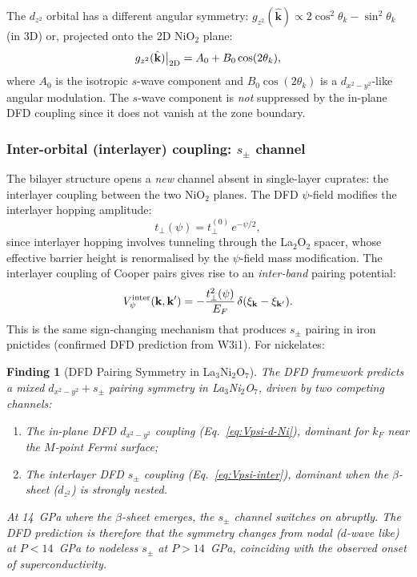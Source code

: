 \documentclass[11pt]{article}
\newtheorem{finding}{Finding}
\begin{document}
The $d_{z^2}$ orbital has a different angular symmetry:
$g_{z^2}(\hat{\mathbf{k}}) \propto 2\cos^2\theta_k - \sin^2\theta_k$
(in 3D) or, projected onto the 2D NiO$_2$ plane:
\begin{equation}
g_{z^2}(\hat{\mathbf{k}})\big|_{\rm 2D}
= A_0 + B_0\cos(2\theta_k),
\label{eq:g-z2-2D}
\end{equation}
where $A_0$ is the isotropic $s$-wave component and $B_0\cos(2\theta_k)$
is a $d_{x^2-y^2}$-like angular modulation. The $s$-wave component
is \emph{not} suppressed by the in-plane DFD coupling since it does not
vanish at the zone boundary.

\subsubsection{Inter-orbital (interlayer) coupling: $s_\pm$ channel}

The bilayer structure opens a \emph{new} channel absent in single-layer
cuprates: the interlayer coupling between the two NiO$_2$ planes. The
DFD $\psi$-field modifies the interlayer hopping amplitude:
\begin{equation}
t_\perp(\psi) = t_\perp^{(0)}\,e^{-\psi/2},
\label{eq:t-perp-psi}
\end{equation}
since interlayer hopping involves tunneling through the La$_2$O$_2$
spacer, whose effective barrier height is renormalised by the $\psi$-field
mass modification. The interlayer coupling of Cooper pairs gives rise
to an \emph{inter-band} pairing potential:
\begin{equation}
V_\psi^{\rm inter}(\mathbf{k},\mathbf{k}')
= -\frac{t_\perp^2(\psi)}{E_F}\,\delta(\xi_\mathbf{k} - \xi_{\mathbf{k}'}).
\label{eq:Vpsi-inter}
\end{equation}
This is the same sign-changing mechanism that produces $s_\pm$ pairing in
iron pnictides (confirmed DFD prediction from W3i1). For nickelates:

\begin{finding}[DFD Pairing Symmetry in La$_3$Ni$_2$O$_7$]
\label{finding:nickelate-pairing}
The DFD framework predicts a \emph{mixed $d_{x^2-y^2} + s_\pm$} pairing
symmetry in La$_3$Ni$_2$O$_7$, driven by two competing channels:
\begin{enumerate}
  \item The in-plane DFD $d_{x^2-y^2}$ coupling (Eq.~\ref{eq:Vpsi-d-Ni}),
        dominant for $k_F$ near the $M$-point Fermi surface;
  \item The interlayer DFD $s_\pm$ coupling (Eq.~\ref{eq:Vpsi-inter}),
        dominant when the $\beta$-sheet ($d_{z^2}$) is strongly nested.
\end{enumerate}
At 14~GPa where the $\beta$-sheet emerges, the $s_\pm$ channel switches on
abruptly. The DFD prediction is therefore that the symmetry changes from
nodal ($d$-wave like) at $P < 14$~GPa to nodeless $s_\pm$ at $P > 14$~GPa,
coinciding with the observed onset of superconductivity.
\end{finding}
\end{document}

